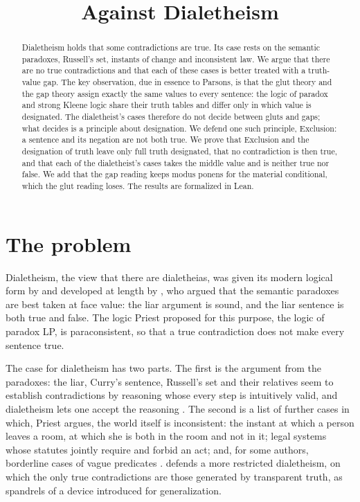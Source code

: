 \documentclass{situationist-preprint}
\title{Against Dialetheism}
\begin{document}
\maketitle

\begin{abstract}
Dialetheism holds that some contradictions are true. Its case rests on the semantic paradoxes, Russell's set, instants of change and inconsistent law. We argue that there are no true contradictions and that each of these cases is better treated with a truth-value gap. The key observation, due in essence to Parsons, is that the glut theory and the gap theory assign exactly the same values to every sentence: the logic of paradox and strong Kleene logic share their truth tables and differ only in which value is designated. The dialetheist's cases therefore do not decide between gluts and gaps; what decides is a principle about designation. We defend one such principle, Exclusion: a sentence and its negation are not both true. We prove that Exclusion and the designation of truth leave only full truth designated, that no contradiction is then true, and that each of the dialetheist's cases takes the middle value and is neither true nor false. We add that the gap reading keeps modus ponens for the material conditional, which the glut reading loses. The results are formalized in Lean.
\end{abstract}

\section{The problem}

Dialetheism, the view that there are dialetheias, was given its modern logical form by \citet{Asenjo1966} and developed at length by \citet{Priest1979,Priest2006}, who argued that the semantic paradoxes are best taken at face value: the liar argument is sound, and the liar sentence is both true and false. The logic Priest proposed for this purpose, the logic of paradox LP, is paraconsistent, so that a true contradiction does not make every sentence true.

The case for dialetheism has two parts. The first is the argument from the paradoxes: the liar, Curry's sentence, Russell's set and their relatives seem to establish contradictions by reasoning whose every step is intuitively valid, and dialetheism lets one accept the reasoning \citep{Priest2006}. The second is a list of further cases in which, Priest argues, the world itself is inconsistent: the instant at which a person leaves a room, at which she is both in the room and not in it; legal systems whose statutes jointly require and forbid an act; and, for some authors, borderline cases of vague predicates \citep{Hyde1997}. \citet{Beall2009} defends a more restricted dialetheism, on which the only true contradictions are those generated by transparent truth, as spandrels of a device introduced for generalization.
\end{document}
